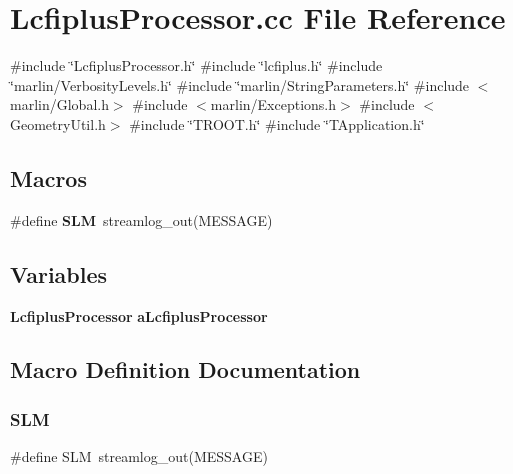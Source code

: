 \section{Lcfiplus\+Processor.\+cc File Reference}
\label{LcfiplusProcessor_8cc}
{\ttfamily \#include \char`\"{}Lcfiplus\+Processor.\+h\char`\"{}}\newline
{\ttfamily \#include \char`\"{}lcfiplus.\+h\char`\"{}}\newline
{\ttfamily \#include \char`\"{}marlin/\+Verbosity\+Levels.\+h\char`\"{}}\newline
{\ttfamily \#include \char`\"{}marlin/\+String\+Parameters.\+h\char`\"{}}\newline
{\ttfamily \#include $<$marlin/\+Global.\+h$>$}\newline
{\ttfamily \#include $<$marlin/\+Exceptions.\+h$>$}\newline
{\ttfamily \#include $<$Geometry\+Util.\+h$>$}\newline
{\ttfamily \#include \char`\"{}T\+R\+O\+O\+T.\+h\char`\"{}}\newline
{\ttfamily \#include \char`\"{}T\+Application.\+h\char`\"{}}\newline
\subsection*{Macros}
\begin{DoxyCompactItemize}
\item 
\#define \textbf{ S\+LM}~streamlog\+\_\+out(M\+E\+S\+S\+A\+GE)
\end{DoxyCompactItemize}
\subsection*{Variables}
\begin{DoxyCompactItemize}
\item 
\textbf{ Lcfiplus\+Processor} \textbf{ a\+Lcfiplus\+Processor}
\end{DoxyCompactItemize}


\subsection{Macro Definition Documentation}
\mbox{\label{LcfiplusProcessor_8cc_a4167df92ac1eb2e31f1600361c7fe0c4}} 
\subsubsection{S\+LM}
{\footnotesize\ttfamily \#define S\+LM~streamlog\+\_\+out(M\+E\+S\+S\+A\+GE)}



